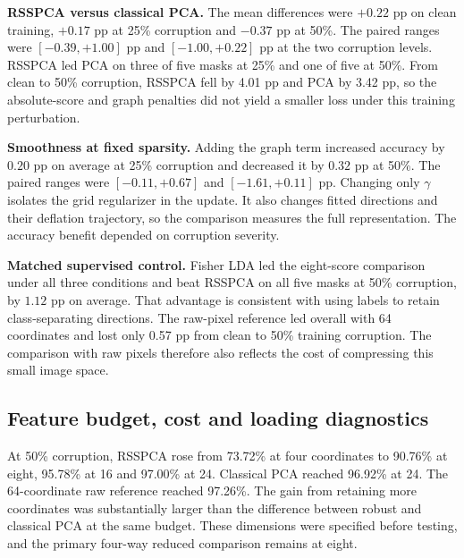 
\textbf{RSSPCA versus classical PCA.}
The mean differences were $+0.22$ pp on clean training, $+0.17$ pp at 25\% corruption and $-0.37$ pp at 50\%. The paired ranges were $[-0.39,+1.00]$ pp and $[-1.00,+0.22]$ pp at the two corruption levels. RSSPCA led PCA on three of five masks at 25\% and one of five at 50\%. From clean to 50\% corruption, RSSPCA fell by 4.01 pp and PCA by 3.42 pp, so the absolute-score and graph penalties did not yield a smaller loss under this training perturbation.

\textbf{Smoothness at fixed sparsity.}
Adding the graph term increased accuracy by $0.20$ pp on average at 25\% corruption and decreased it by $0.32$ pp at 50\%. The paired ranges were $[-0.11,+0.67]$ and $[-1.61,+0.11]$ pp. Changing only $\gamma$ isolates the grid regularizer in the update. It also changes fitted directions and their deflation trajectory, so the comparison measures the full representation. The accuracy benefit depended on corruption severity.

\textbf{Matched supervised control.}
Fisher LDA led the eight-score comparison under all three conditions and beat RSSPCA on all five masks at 50\% corruption, by $1.12$ pp on average. That advantage is consistent with using labels to retain class-separating directions. The raw-pixel reference led overall with 64 coordinates and lost only 0.57 pp from clean to 50\% training corruption. The comparison with raw pixels therefore also reflects the cost of compressing this small image space.

\clearpage
\subsection{Feature budget, cost and loading diagnostics}


At 50\% corruption, RSSPCA rose from 73.72\% at four coordinates to 90.76\% at eight, 95.78\% at 16 and 97.00\% at 24. Classical PCA reached 96.92\% at 24. The 64-coordinate raw reference reached 97.26\%. The gain from retaining more coordinates was substantially larger than the difference between robust and classical PCA at the same budget. These dimensions were specified before testing, and the primary four-way reduced comparison remains at eight.

